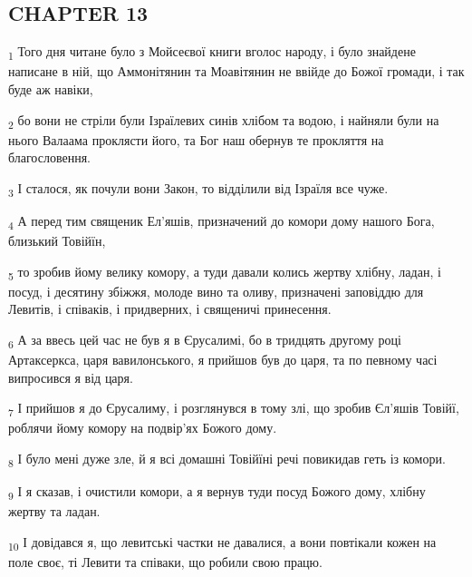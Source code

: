 \subsection{CHAPTER 13}
\begin{tcolorbox}
\textsubscript{1} Того дня читане було з Мойсеєвої книги вголос народу, і було знайдене написане в ній, що Аммонітянин та Моавітянин не ввійде до Божої громади, і так буде аж навіки,
\end{tcolorbox}
\begin{tcolorbox}
\textsubscript{2} бо вони не стріли були Ізраїлевих синів хлібом та водою, і найняли були на нього Валаама проклясти його, та Бог наш обернув те прокляття на благословення.
\end{tcolorbox}
\begin{tcolorbox}
\textsubscript{3} І сталося, як почули вони Закон, то відділили від Ізраїля все чуже.
\end{tcolorbox}
\begin{tcolorbox}
\textsubscript{4} А перед тим священик Ел'яшів, призначений до комори дому нашого Бога, близький Товійїн,
\end{tcolorbox}
\begin{tcolorbox}
\textsubscript{5} то зробив йому велику комору, а туди давали колись жертву хлібну, ладан, і посуд, і десятину збіжжя, молоде вино та оливу, призначені заповіддю для Левитів, і співаків, і придверних, і священичі принесення.
\end{tcolorbox}
\begin{tcolorbox}
\textsubscript{6} А за ввесь цей час не був я в Єрусалимі, бо в тридцять другому році Артаксеркса, царя вавилонського, я прийшов був до царя, та по певному часі випросився я від царя.
\end{tcolorbox}
\begin{tcolorbox}
\textsubscript{7} І прийшов я до Єрусалиму, і розглянувся в тому злі, що зробив Єл'яшів Товійї, роблячи йому комору на подвір'ях Божого дому.
\end{tcolorbox}
\begin{tcolorbox}
\textsubscript{8} І було мені дуже зле, й я всі домашні Товійїні речі повикидав геть із комори.
\end{tcolorbox}
\begin{tcolorbox}
\textsubscript{9} І я сказав, і очистили комори, а я вернув туди посуд Божого дому, хлібну жертву та ладан.
\end{tcolorbox}
\begin{tcolorbox}
\textsubscript{10} І довідався я, що левитські частки не давалися, а вони повтікали кожен на поле своє, ті Левити та співаки, що робили свою працю.
\end{tcolorbox}
